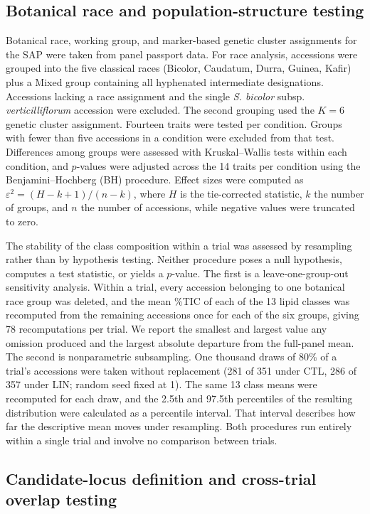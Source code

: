 \documentclass[9pt,twocolumn,twoside]{rilabRxiv}
\begin{document}
\subsection*{Botanical race and population-structure testing}

Botanical race, working group, and marker-based genetic cluster assignments for the SAP were taken from panel passport data. For race analysis, accessions were grouped into the five classical races (Bicolor, Caudatum, Durra, Guinea, Kafir) plus a Mixed group containing all hyphenated intermediate designations. Accessions lacking a race assignment and the single \textit{S. bicolor} subsp. \textit{verticilliflorum} accession were excluded. The second grouping used the $K=6$ genetic cluster assignment. Fourteen traits were tested per condition. Groups with fewer than five accessions in a condition were excluded from that test. Differences among groups were assessed with Kruskal--Wallis tests within each condition, and $p$-values were adjusted across the 14 traits per condition using the Benjamini--Hochberg (BH) procedure. Effect sizes were computed as $\varepsilon^2=(H-k+1)/(n-k)$, where $H$ is the tie-corrected statistic, $k$ the number of groups, and $n$ the number of accessions, while negative values were truncated to zero. 

The stability of the class composition within a trial was assessed by resampling rather than by hypothesis testing. Neither procedure poses a null hypothesis, computes a test statistic, or yields a $p$-value. The first is a leave-one-group-out sensitivity analysis. Within a trial, every accession belonging to one botanical race group was deleted, and the mean \%TIC of each of the 13 lipid classes was recomputed from the remaining accessions once for each of the six groups, giving 78 recomputations per trial. We report the smallest and largest value any omission produced and the largest absolute departure from the full-panel mean. The second is nonparametric subsampling. One thousand draws of 80\% of a trial's accessions were taken without replacement (281 of 351 under CTL, 286 of 357 under LIN; random seed fixed at 1). The same 13 class means were recomputed for each draw, and the 2.5th and 97.5th percentiles of the resulting distribution were calculated as a percentile interval. That interval describes how far the descriptive mean moves under resampling. Both procedures run entirely within a single trial and involve no comparison between trials.

\subsection*{Candidate-locus definition and cross-trial overlap testing}
\end{document}
